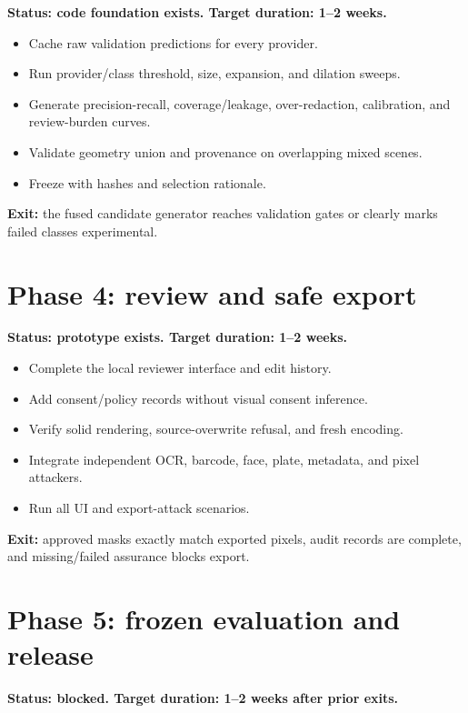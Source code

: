 \textbf{Status: code foundation exists. Target duration: 1--2 weeks.}

\begin{itemize}[leftmargin=6mm]
  \item Cache raw validation predictions for every provider.
  \item Run provider/class threshold, size, expansion, and dilation sweeps.
  \item Generate precision-recall, coverage/leakage, over-redaction, calibration, and review-burden curves.
  \item Validate geometry union and provenance on overlapping mixed scenes.
  \item Freeze  with hashes and selection rationale.
\end{itemize}

\textbf{Exit:} the fused candidate generator reaches validation gates or clearly marks failed classes experimental.

\section{Phase 4: review and safe export}

\textbf{Status: prototype exists. Target duration: 1--2 weeks.}

\begin{itemize}[leftmargin=6mm]
  \item Complete the local reviewer interface and edit history.
  \item Add consent/policy records without visual consent inference.
  \item Verify solid rendering, source-overwrite refusal, and fresh encoding.
  \item Integrate independent OCR, barcode, face, plate, metadata, and pixel attackers.
  \item Run all UI and export-attack scenarios.
\end{itemize}

\textbf{Exit:} approved masks exactly match exported pixels, audit records are complete, and missing/failed assurance blocks export.

\section{Phase 5: frozen evaluation and release}

\textbf{Status: blocked. Target duration: 1--2 weeks after prior exits.}

